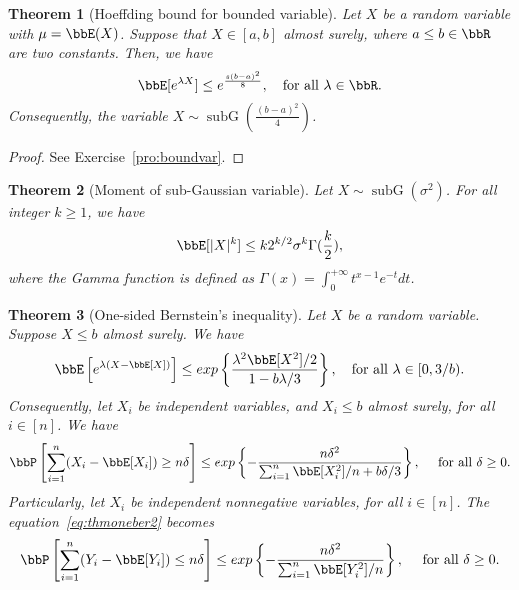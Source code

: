 \documentclass[11pt]{article}
\DeclareMathOperator{\subG}{subG}
\theoremstyle{plain}
\newtheorem{thm}{Theorem}[section]
\theoremstyle{definition}
\begin{document}
\begin{thm}[Hoeffding bound for bounded variable]\label{thm:boundvar}
Let $X$ be a random variable with $\mu = \bbE(X)$. Suppose that $X \in [a,b]$ almost surely, where $a\leq b\in\bbR$ are two constants. Then, we have
\begin{equation}
	\bbE[e^{\lambda X}] \leq e^{\frac{s(b-a)^2}{8}}, \quad \text{for all } \lambda \in \bbR.
\end{equation}
Consequently, the variable $X \sim \subG\left(\frac{(b-a)^2}{4}\right)$.
\end{thm}

\begin{proof}
	See Exercise~\ref{pro:boundvar}.
\end{proof}



\begin{thm}[Moment of sub-Gaussian variable]\label{thm:momsubg}
Let $X \sim \subG(\sigma^2)$. For all integer $k \geq 1$, we have
\begin{equation}\label{eq:thmmomsubg}
	\bbE[|X|^k] \leq  k 2^{k/2} \sigma^k \Gamma(\frac{k}{2} ),
\end{equation} 
where the Gamma function is defined as $\Gamma(x) = \int_{0}^{+\infty} t^{x -1} e^{-t} dt$. 
\end{thm}


\begin{thm}[One-sided Bernstein’s inequality]\label{thm:oneber}
 Let $X$ be a random variable. Suppose $X \leq b$ almost surely. We have 
\begin{equation}\label{eq:thmoneber1}
	\bbE\left[e^{\lambda (X-\bbE[X])}\right] \leq exp\left\{ \frac{\lambda^2 \bbE[X^2]/2}{1 - b\lambda /3}  \right\}, \quad \text{for all } \lambda \in [0, 3/b).
\end{equation}
Consequently, let $X_i$ be independent variables, and $X_i \leq b$ almost surely, for all $i \in [n]$. We have
\begin{equation}\label{eq:thmoneber2}
	\bbP\left[\sum_{i = 1}^n (X_i - \bbE[X_i] ) \geq n\delta \right] \leq exp\left\{ - \frac{n\delta^2}{\sum_{i = 1}^n \bbE[X_i^2] /n + b \delta /3} \right\},\quad \text{ for all } \delta \geq 0.
\end{equation}  
Particularly, let $X_i$ be independent nonnegative variables, for all $i \in [n]$. The equation~\eqref{eq:thmoneber2} becomes
\begin{equation}\label{eq:thmonber0}
	\bbP\left[\sum_{i = 1}^n (Y_i - \bbE[Y_i] ) \leq n\delta \right] \leq exp\left\{ - \frac{n\delta^2}{\sum_{i = 1}^n \bbE[Y_i^2] /n} \right\},\quad \text{ for all } \delta \geq 0.
\end{equation} 
\end{thm}
\end{document}
